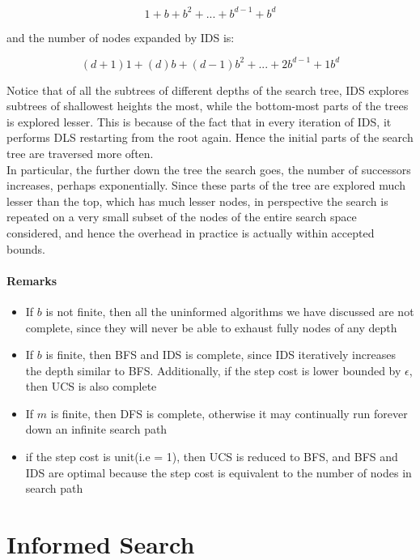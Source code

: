 \documentclass[12pt]{article}
\begin{document}
\begin{equation*}
1 + b + b^2 + ... + b^{d-1} + b^d
\end{equation*}

and the number of nodes expanded by IDS is:

\begin{equation*}
(d+1)1 + (d)b + (d-1)b^2 + ... + 2b^{d-1} + 1b^d
\end{equation*}

Notice that of all the subtrees of different depths of the search tree, IDS explores subtrees of shallowest heights the most, while the bottom-most parts of the trees is explored lesser. This is because of the fact that in every iteration of IDS, it performs DLS restarting from the root again. Hence the initial parts of the search tree are traversed more often. \\

In particular, the further down the tree the search goes, the number of successors increases, perhaps exponentially. Since these parts of the tree are explored much lesser than the top, which has much lesser nodes, in perspective the search is repeated on a very small subset of the nodes of the entire search space considered, and hence the overhead in practice is actually within accepted bounds.

\paragraph{Remarks}
\begin{itemize}
\item If $b$ is not finite, then all the uninformed algorithms we have discussed are not complete, since they will never be able to exhaust fully nodes of any depth
\item If $b$ is finite, then BFS and IDS is complete, since IDS iteratively increases the depth similar to BFS. Additionally, if the step cost is lower bounded by $\epsilon$, then UCS is also complete
\item If $m$ is finite, then DFS is complete, otherwise it may continually run forever down an infinite search path
\item if the step cost is unit(i.e = 1), then UCS is reduced to BFS, and BFS and IDS are optimal because the step cost is equivalent to the number of nodes in search path
\end{itemize}
\pagebreak

\section{Informed Search}
\end{document}
